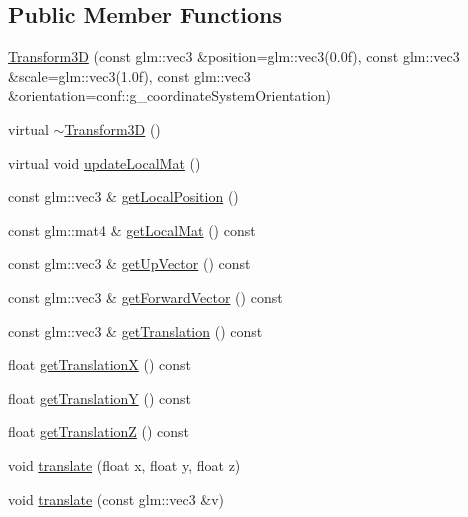 \subsection*{Public Member Functions}
\begin{DoxyCompactItemize}
\item 
\mbox{\hyperlink{classec_1_1_transform3_d_adb5c661621922b1a3a6e6433ce1c79f6}{Transform3D}} (const glm\+::vec3 \&position=glm\+::vec3(0.\+0f), const glm\+::vec3 \&scale=glm\+::vec3(1.\+0f), const glm\+::vec3 \&orientation=conf\+::g\+\_\+coordinate\+System\+Orientation)
\item 
virtual \mbox{\hyperlink{classec_1_1_transform3_d_a1df4b7afcf78aef64719b2302cfac864}{$\sim$\+Transform3D}} ()
\item 
virtual void \mbox{\hyperlink{classec_1_1_transform3_d_a68d259da063ea2aff48720ae55870445}{update\+Local\+Mat}} ()
\item 
const glm\+::vec3 \& \mbox{\hyperlink{classec_1_1_transform3_d_a69ce5285f9481b5615c084b9f892fdb8}{get\+Local\+Position}} ()
\item 
const glm\+::mat4 \& \mbox{\hyperlink{classec_1_1_transform3_d_a8aa0ac4df795971dad499a0d12348d07}{get\+Local\+Mat}} () const
\item 
const glm\+::vec3 \& \mbox{\hyperlink{classec_1_1_transform3_d_af8bdfb3bbc688a9a920ccb4d452d8962}{get\+Up\+Vector}} () const
\item 
const glm\+::vec3 \& \mbox{\hyperlink{classec_1_1_transform3_d_afc4f5c1122a5191ad2a4628a43a76a7c}{get\+Forward\+Vector}} () const
\item 
const glm\+::vec3 \& \mbox{\hyperlink{classec_1_1_transform3_d_a73b5f3bfbeb73eb4f445b1941b8e359d}{get\+Translation}} () const
\item 
float \mbox{\hyperlink{classec_1_1_transform3_d_ac0371b75ed67d59665967846d9cc6827}{get\+TranslationX}} () const
\item 
float \mbox{\hyperlink{classec_1_1_transform3_d_a18d2aca82a3b8944815801963f32ab8c}{get\+TranslationY}} () const
\item 
float \mbox{\hyperlink{classec_1_1_transform3_d_a5d7ec019acf68cb930db1a7db79ef97f}{get\+TranslationZ}} () const
\item 
void \mbox{\hyperlink{classec_1_1_transform3_d_a9c143bdc0bf020940b9b6bd7e2a01d45}{translate}} (float x, float y, float z)
\item 
void \mbox{\hyperlink{classec_1_1_transform3_d_ae0290297c16ee5ce4f6cf2855fd26aa0}{translate}} (const glm\+::vec3 \&v)
\item 

\end{DoxyCompactItemize}
